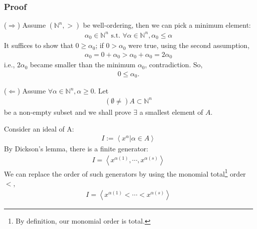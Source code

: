 \documentclass[11pt]{book}
\begin{document}
\subsubsection{Proof}
($\Rightarrow$)
Assume $(\mathbb{N}^n, >)$ be well-ordering, then we can pick a minimum element:
\begin{eqnarray}
\alpha_0 \in \mathbb{N}^n \text{ s.t. } \forall \alpha \in \mathbb{N}^n, \alpha_0 \leq \alpha
\end{eqnarray}
It suffices to show that $0 \geq \alpha_0$; if $0 > \alpha_0$ were true, using the second assumption,
\begin{eqnarray}
\alpha_0 = 0 + \alpha_0 > \alpha_0 + \alpha_0 = 2\alpha_0
\end{eqnarray}
i.e., $2\alpha_0$ became smaller than the minimum $\alpha_0$, contradiction.
So,
\begin{eqnarray}
0 \leq \alpha_0.
\end{eqnarray}

($\Leftarrow$)
Assume $\forall \alpha \in \mathbb{N}^n, \alpha \geq 0$.
Let
\begin{eqnarray}
(\emptyset \neq )A \subset \mathbb{N}^n
\end{eqnarray}
be a non-empty subset and we shall prove $\exists$ a smallest element of $A$.

Consider an ideal of A:
\begin{eqnarray}
I := \left< \left. x^\alpha \right| \alpha \in A\right> 
\end{eqnarray}
By Dickson's lemma, there is a finite generator:
\begin{eqnarray}
I = \left< x^{\alpha(1)}, \cdots, x^{\alpha(s)} \right> 
\end{eqnarray}
We can replace the order of such generators by using the monomial total\footnote{By definition, our monomial order is total.} order $<$, 
\begin{eqnarray}
I = \left< x^{\alpha(1)} < \cdots< x^{\alpha(s)} \right> 
\end{eqnarray}
\end{document}
